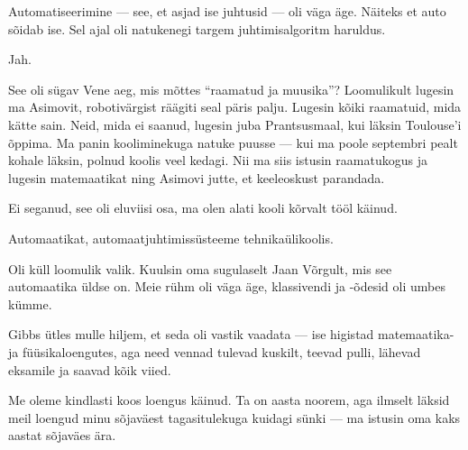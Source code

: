 
Automatiseerimine --- see, et asjad ise juhtusid --- oli väga äge. Näiteks et
auto sõidab ise. Sel ajal oli natukenegi targem 
juhtimisalgoritm haruldus.


Jah.


See oli sügav Vene aeg, mis mõttes \enquote{raamatud ja muusika}? 
Loomulikult lugesin ma Asimovit, robotivärgist räägiti seal päris palju. Lugesin kõiki 
raamatuid, mida kätte sain. Neid, mida ei saanud, lugesin 
juba Prantsusmaal, kui läksin Toulouse'i õppima. Ma panin 
kooliminekuga natuke puusse --- kui ma poole septembri pealt kohale läksin, 
polnud koolis veel kedagi. Nii ma siis 
istusin raamatukogus ja lugesin matemaatikat ning Asimovi jutte, et keeleoskust parandada.


Ei seganud, see oli eluviisi osa, ma olen alati kooli kõrvalt tööl 
käinud.


Automaatikat, automaatjuhtimissüsteeme tehnikaülikoolis.


Oli küll loomulik valik. Kuulsin oma sugulaselt Jaan 
Võrgult, mis 
see automaatika üldse on. Meie rühm oli väga äge, klassivendi ja -õdesid
oli umbes kümme. 

Gibbs ütles mulle hiljem, et seda oli 
vastik vaadata --- ise higistad matemaatika- ja füüsikaloengutes, aga 
need vennad tulevad kuskilt, teevad pulli, lähevad eksamile ja saavad 
kõik viied. 


Me oleme kindlasti koos loengus käinud. Ta on aasta noorem, aga ilmselt läksid meil loengud minu sõjaväest tagasitulekuga kuidagi sünki --- ma istusin oma kaks aastat sõjaväes ära.

